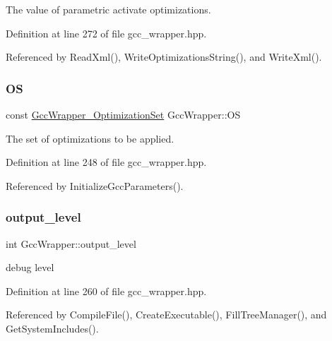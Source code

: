 The value of parametric activate optimizations. 



Definition at line 272 of file gcc\+\_\+wrapper.\+hpp.



Referenced by Read\+Xml(), Write\+Optimizations\+String(), and Write\+Xml().

\mbox{\label{classGccWrapper_a5494d211289aec8f9b4231c860489c6a}} 
\subsubsection{\texorpdfstring{OS}{OS}}
{\footnotesize\ttfamily const \hyperlink{gcc__wrapper_8hpp_a0f57d29a8e8442ddf6d2cd8577c6788d}{Gcc\+Wrapper\+\_\+\+Optimization\+Set} Gcc\+Wrapper\+::\+OS\hspace{0.3cm}{\ttfamily [private]}}



The set of optimizations to be applied. 



Definition at line 248 of file gcc\+\_\+wrapper.\+hpp.



Referenced by Initialize\+Gcc\+Parameters().

\mbox{\label{classGccWrapper_ad81479e81dbbfbfc2ef21f26b61f43b9}} 
\subsubsection{\texorpdfstring{output\+\_\+level}{output\_level}}
{\footnotesize\ttfamily int Gcc\+Wrapper\+::output\+\_\+level\hspace{0.3cm}{\ttfamily [private]}}



debug level 



Definition at line 260 of file gcc\+\_\+wrapper.\+hpp.



Referenced by Compile\+File(), Create\+Executable(), Fill\+Tree\+Manager(), and Get\+System\+Includes().

\mbox{\label{classGccWrapper_ae052c2164d449f57b725ab2d2fc41779}} 
